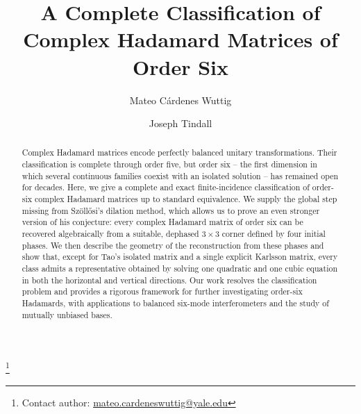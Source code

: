 \documentclass[aps,prx,reprint,nofootinbib,twoside,superscriptaddress,longbibliography,floatfix]{revtex4-2}
\theoremstyle{definition}
\begin{document}
\newcommand{\MainCiteHaagerupSzollosi}{%
  ~\cite{Haagerup1997,Szollosi2012FourParameter}}
\newcommand{\MainCiteSzollosi}{~\cite{Szollosi2012FourParameter}}
\newcommand{\MainCiteBasu}{~\cite{BasuPollackRoy2006}}
\newcommand{\MainCiteBondal}{~\cite{BondalZhdanovskiy2016}}

\title{A Complete Classification of Complex Hadamard Matrices of Order Six}

\author{Mateo C\'ardenes Wuttig}
\thanks{Contact author: \href{mailto:mateo.cardeneswuttig@yale.edu}%
{mateo.cardeneswuttig@yale.edu}}
\author{Joseph Tindall}

\ifdefined\SupplementOnly
\maketitle
\tableofcontents
\clearpage
\hypertarget{main-article-numbering}{}
\else
\begin{abstract}
Complex Hadamard matrices encode perfectly balanced unitary transformations.
Their classification is complete through order five, but order six -- the first dimension in which several continuous families coexist with an isolated solution -- has remained open for decades. Here, we give a complete and exact finite-incidence classification of order-six complex Hadamard matrices up to standard equivalence.
We supply the global step missing from Sz\"oll\H{o}si's dilation method, which allows us to prove an even stronger version of his conjecture: every complex Hadamard matrix of order six can be recovered algebraically from a suitable, dephased $3 \times 3$ corner defined by four initial phases.
We then describe the geometry of the reconstruction from these phases and show that, except for Tao's isolated matrix and a single explicit Karlsson matrix, every class admits a representative obtained by solving one quadratic and one cubic equation in both the horizontal and vertical directions.
Our work resolves the classification problem and provides a rigorous framework for further investigating order-six Hadamards, with applications to balanced six-mode interferometers and the study of mutually unbiased bases.
\end{abstract}
\maketitle
\end{document}
